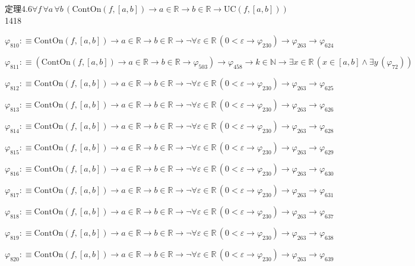 \begin{fullproof}{定理4.6}{$\forall f\,\forall a\,\forall b\,(\mathrm{ContOn}(f,[a,b]) \to a \in \mathbb{R} \to b \in \mathbb{R} \to \mathrm{UC}(f,[a,b]))$}{1418}
\begin{abbrevlist}
\item $\varphi_{810} :\equiv \mathrm{ContOn}(f,[a,b]) \to a \in \mathbb{R} \to b \in \mathbb{R} \to \neg \forall \varepsilon \in \mathbb{R}\,(0 < \varepsilon \to \varphi_{230}) \to \varphi_{263} \to \varphi_{624}$
\item $\varphi_{811} :\equiv (\mathrm{ContOn}(f,[a,b]) \to a \in \mathbb{R} \to b \in \mathbb{R} \to \varphi_{503}) \to \varphi_{458} \to k \in \mathbb{N} \to \exists x \in \mathbb{R}\,(x \in [a,b] \land \exists y\,(\varphi_{72}))$
\item $\varphi_{812} :\equiv \mathrm{ContOn}(f,[a,b]) \to a \in \mathbb{R} \to b \in \mathbb{R} \to \neg \forall \varepsilon \in \mathbb{R}\,(0 < \varepsilon \to \varphi_{230}) \to \varphi_{263} \to \varphi_{625}$
\item $\varphi_{813} :\equiv \mathrm{ContOn}(f,[a,b]) \to a \in \mathbb{R} \to b \in \mathbb{R} \to \neg \forall \varepsilon \in \mathbb{R}\,(0 < \varepsilon \to \varphi_{230}) \to \varphi_{263} \to \varphi_{626}$
\item $\varphi_{814} :\equiv \mathrm{ContOn}(f,[a,b]) \to a \in \mathbb{R} \to b \in \mathbb{R} \to \neg \forall \varepsilon \in \mathbb{R}\,(0 < \varepsilon \to \varphi_{230}) \to \varphi_{263} \to \varphi_{628}$
\item $\varphi_{815} :\equiv \mathrm{ContOn}(f,[a,b]) \to a \in \mathbb{R} \to b \in \mathbb{R} \to \neg \forall \varepsilon \in \mathbb{R}\,(0 < \varepsilon \to \varphi_{230}) \to \varphi_{263} \to \varphi_{629}$
\item $\varphi_{816} :\equiv \mathrm{ContOn}(f,[a,b]) \to a \in \mathbb{R} \to b \in \mathbb{R} \to \neg \forall \varepsilon \in \mathbb{R}\,(0 < \varepsilon \to \varphi_{230}) \to \varphi_{263} \to \varphi_{630}$
\item $\varphi_{817} :\equiv \mathrm{ContOn}(f,[a,b]) \to a \in \mathbb{R} \to b \in \mathbb{R} \to \neg \forall \varepsilon \in \mathbb{R}\,(0 < \varepsilon \to \varphi_{230}) \to \varphi_{263} \to \varphi_{631}$
\item $\varphi_{818} :\equiv \mathrm{ContOn}(f,[a,b]) \to a \in \mathbb{R} \to b \in \mathbb{R} \to \neg \forall \varepsilon \in \mathbb{R}\,(0 < \varepsilon \to \varphi_{230}) \to \varphi_{263} \to \varphi_{637}$
\item $\varphi_{819} :\equiv \mathrm{ContOn}(f,[a,b]) \to a \in \mathbb{R} \to b \in \mathbb{R} \to \neg \forall \varepsilon \in \mathbb{R}\,(0 < \varepsilon \to \varphi_{230}) \to \varphi_{263} \to \varphi_{638}$
\item $\varphi_{820} :\equiv \mathrm{ContOn}(f,[a,b]) \to a \in \mathbb{R} \to b \in \mathbb{R} \to \neg \forall \varepsilon \in \mathbb{R}\,(0 < \varepsilon \to \varphi_{230}) \to \varphi_{263} \to \varphi_{639}$

\end{abbrevlist}
\end{fullproof}
